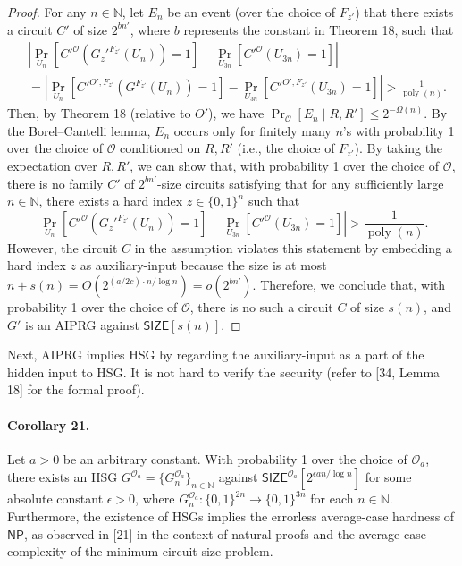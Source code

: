 \begin{proof}
For any $n\in\mathbb N$, let $E_n$ be an event (over the choice of $F_{z'}$) that there exists a circuit $C'$ of size $2^{bn'}$, where $b$ represents the constant in Theorem 18, such that
\begin{align*}
&\left|\Pr_{U_n}[C'^{\mathcal O}(G_z'^{F_{z'}}(U_n))=1]-\Pr_{U_{3n}}[C'^{\mathcal O}(U_{3n})=1]\right|\\
&=\left|\Pr_{U_n}[C'^{O',F_{z'}}(G^{F_{z'}}(U_n))=1]-\Pr_{U_{3n}}[C'^{O',F_{z'}}(U_{3n})=1]\right|>\frac1{\operatorname{poly}(n)}.
\end{align*}
Then, by Theorem 18 (relative to $O'$), we have $\Pr_{\mathcal O}[E_n\mid R,R']\leq2^{-\Omega(n)}$. By the Borel--Cantelli lemma, $E_n$ occurs only for finitely many $n$'s with probability 1 over the choice of $\mathcal O$ conditioned on $R,R'$ (i.e., the choice of $F_{z'}$). By taking the expectation over $R,R'$, we can show that, with probability 1 over the choice of $\mathcal O$, there is no family $C'$ of $2^{bn'}$-size circuits satisfying that for any sufficiently large $n\in\mathbb N$, there exists a hard index $z\in\{0,1\}^n$ such that
\[\left|\Pr_{U_n}[C'^{\mathcal O}(G_z'^{F_{z'}}(U_n))=1]-\Pr_{U_{3n}}[C'^{\mathcal O}(U_{3n})=1]\right|>\frac1{\operatorname{poly}(n)}.\]
However, the circuit $C$ in the assumption violates this statement by embedding a hard index $z$ as auxiliary-input because the size is at most $n+s(n)=O(2^{(a/2c)\cdot n/\log n})=o(2^{bn'})$. Therefore, we conclude that, with probability 1 over the choice of $\mathcal O$, there is no such a circuit $C$ of size $s(n)$, and $G'$ is an AIPRG against $\mathsf{SIZE}[s(n)]$.
\end{proof}
Next, AIPRG implies HSG by regarding the auxiliary-input as a part of the hidden input to HSG. It is not hard to verify the security (refer to [34, Lemma 18] for the formal proof).
\paragraph{Corollary 21.}
Let $a>0$ be an arbitrary constant. With probability 1 over the choice of $\mathcal O_a$, there exists an HSG $G^{\mathcal O_a}=\{G_n^{\mathcal O_a}\}_{n\in\mathbb N}$ against $\mathsf{SIZE}^{\mathcal O_a}[2^{\epsilon an/\log n}]$ for some absolute constant $\epsilon>0$, where $G_n^{\mathcal O_a}:\{0,1\}^{2n}\to\{0,1\}^{3n}$ for each $n\in\mathbb N$.
Furthermore, the existence of HSGs implies the errorless average-case hardness of $\mathsf{NP}$, as observed in [21] in the context of natural proofs and the average-case complexity of the minimum circuit size problem.
